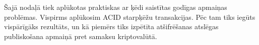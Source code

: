 Šajā nodaļā tiek aplūkotas praktiskas ar ķēdi saistītas godīgas apmaiņas problēmas.
Vispirms aplūkosim ACID starpķēžu transakcijas.
Pēc tam tiks iegūts vispārīgāks rezultāts, %
un kā piemērs tiks izpētīta atšifrēšanas atslēgas publiskošana apmaiņā pret samaksu kriptovalūtā.